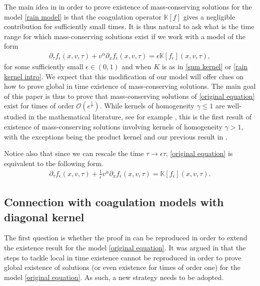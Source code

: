 \documentclass[11pt]{article}
\numberwithin{equation}{section}
\begin{document}
The main idea in \cite{cristianinhom} in order to prove existence of mass-conserving solutions for the model \eqref{rain model} is that the coagulation operator $\mathbb{K}[f]$ gives a negligible contribution for sufficiently small times. It is thus natural to ask what is the time range for which mass-conserving solutions exist if we work with a model of the form
\begin{align}\label{original equation}
    \partial_{\tau}f_{\epsilon}(x,v,\tau)+v^{\alpha}\partial_{x}f_{\epsilon}(x,v,\tau)=\epsilon \mathbb{K}[f_{\epsilon}](x,v,\tau),
\end{align}
for some sufficiently small $\epsilon\in(0,1)$ and when $K$ is as in \eqref{sum kernel} or \eqref{rain kernel intro}. We expect that this modification of our model will offer clues on how to prove global in time existence of mass-conserving solutions. The main goal of this paper is thus to prove that mass-conserving solutions of \eqref{original equation} exist for times of order $\mathcal{O}(e^{\frac{1}{\epsilon}})$. While kernels of homogeneity $\gamma\leq 1$ are well-studied in the mathematical literature, see for example \cite{escobedomischler, escobedomischler2, stewart}, this is the first result of existence of mass-conserving solutions involving kernels of homogeneity $\gamma>1$, with the exceptions being the product kernel \cite{menonpego,tranvan} and our previous result in \cite{cristianinhom}.

Notice also that since we can rescale the time $\tau\rightarrow \epsilon \tau$, \eqref{original equation} is equivalent to the following form.
\begin{align}\label{one over epsilon first time}
\partial_{\tau}f_{\epsilon}(x,v,\tau)+\frac{1}{\epsilon}v^{\alpha}\partial_{x}f_{\epsilon}(x,v,\tau)= \mathbb{K}[f_{\epsilon}](x,v,\tau).
\end{align}



\subsection{Connection with coagulation models with diagonal kernel}
The first question is whether the proof in \cite{cristianinhom} can be reproduced in order to extend the existence result for the model \eqref{original equation}. It was argued in \cite[Section 6.4]{phdthesis} that  the steps to tackle
local in time existence cannot be reproduced in order to prove global existence of solutions (or even existence for times of order one) for the model \eqref{original equation}. As such, a new strategy needs to be adopted.
\end{document}
